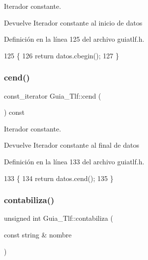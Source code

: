 Iterador constante. 

\begin{DoxyReturn}{Devuelve}
Iterador constante al inicio de datos 
\end{DoxyReturn}


Definición en la línea 125 del archivo guiatlf.\+h.


\begin{DoxyCode}
125                                  \{
126         \textcolor{keywordflow}{return} datos.cbegin();
127     \}
\end{DoxyCode}
\mbox{\label{classGuia__Tlf_afd2dd5c9f44f3c5b26d2475b7d9de04c}} 
\subsubsection{\texorpdfstring{cend()}{cend()}}
{\footnotesize\ttfamily const\+\_\+iterator Guia\+\_\+\+Tlf\+::cend (\begin{DoxyParamCaption}{ }\end{DoxyParamCaption}) const\hspace{0.3cm}{\ttfamily [inline]}}



Iterador constante. 

\begin{DoxyReturn}{Devuelve}
Iterador constante al final de datos 
\end{DoxyReturn}


Definición en la línea 133 del archivo guiatlf.\+h.


\begin{DoxyCode}
133                                \{
134         \textcolor{keywordflow}{return} datos.cend();
135     \}
\end{DoxyCode}
\mbox{\label{classGuia__Tlf_aa63213524c6339ea89baae2b5d2ebb69}} 
\subsubsection{\texorpdfstring{contabiliza()}{contabiliza()}}
{\footnotesize\ttfamily unsigned int Guia\+\_\+\+Tlf\+::contabiliza (\begin{DoxyParamCaption}\item[{const string \&}]{nombre }\end{DoxyParamCaption})}



